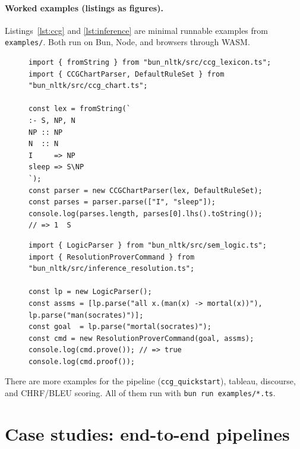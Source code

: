 \documentclass[pdflatex,sn-mathphys-num]{sn-jnl}
\theoremstyle{thmstyleone}
\begin{document}
\paragraph{Worked examples (listings as figures).}

Listings~\ref{lst:ccg} and \ref{lst:inference} are minimal runnable examples from \texttt{examples/}. Both run on Bun, Node, and browsers through WASM.

\begin{figure}[H]
\begin{lstlisting}[caption={Example: CCG chart parse ``I sleep'' $\Rightarrow$ S (\texttt{examples/ccg\_quickstart.ts}).},label={lst:ccg}]
import { fromString } from "bun_nltk/src/ccg_lexicon.ts";
import { CCGChartParser, DefaultRuleSet } from "bun_nltk/src/ccg_chart.ts";

const lex = fromString(`
:- S, NP, N
NP :: NP
N  :: N
I     => NP
sleep => S\NP
`);
const parser = new CCGChartParser(lex, DefaultRuleSet);
const parses = parser.parse(["I", "sleep"]);
console.log(parses.length, parses[0].lhs().toString());
// => 1  S
\end{lstlisting}
\end{figure}

\begin{figure}[H]
\begin{lstlisting}[caption={FOL resolution example (\texttt{examples/inference\_resolution.ts}).},label={lst:inference}]
import { LogicParser } from "bun_nltk/src/sem_logic.ts";
import { ResolutionProverCommand } from "bun_nltk/src/inference_resolution.ts";

const lp = new LogicParser();
const assms = [lp.parse("all x.(man(x) -> mortal(x))"), lp.parse("man(socrates)")];
const goal  = lp.parse("mortal(socrates)");
const cmd = new ResolutionProverCommand(goal, assms);
console.log(cmd.prove()); // => true
console.log(cmd.proof());
\end{lstlisting}
\end{figure}

There are more examples for the pipeline (\texttt{ccg\_quickstart}), tableau, discourse, and CHRF/BLEU scoring. All of them run with \texttt{bun run examples/*.ts}.

\section{Case studies: end-to-end pipelines}\label{sec:usecases}
\end{document}
